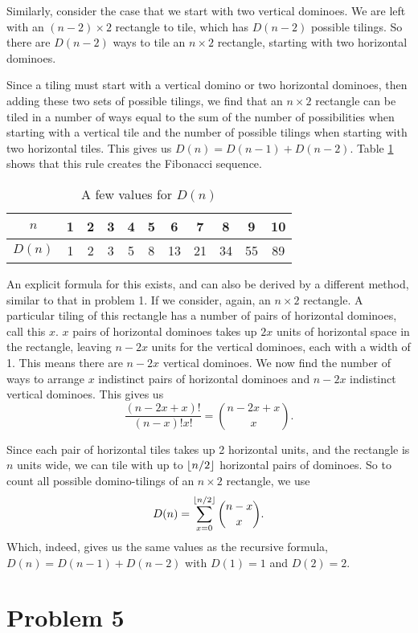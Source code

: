 \documentclass[12pt]{article}
\DeclarePairedDelimiter\floor{\lfloor}{\rfloor}
\begin{document}
Similarly, consider the case that we start with two vertical dominoes. We are left with an $(n-2)\times 2$ rectangle to tile, which has $D(n-2)$ possible tilings. So there are $D(n-2)$ ways to tile an $n\times 2$ rectangle, starting with two horizontal dominoes.

Since a tiling must start with a vertical domino or two horizontal dominoes, then adding these two sets of possible tilings, we find that an $n\times 2$ rectangle can be tiled in a number of ways equal to the sum of the number of possibilities when starting with a vertical tile and the number of possible tilings when starting with two horizontal tiles. This gives us $D(n) = D(n-1) + D(n-2)$. Table \ref{tab:dtab} shows that this rule creates the Fibonacci sequence. 

\begin{table}[ht]
    \centering
    \begin{tabular}{c|cccccccccc}
        $n$ & 1 & 2 & 3 & 4 & 5 & 6 & 7 & 8 & 9 & 10 \\
        \hline
        \cellcolor{white} $D(n)$ & 1 & 2 & 3 & 5 & 8 & 13 & 21 & 34 & 55 & 89
    \end{tabular}
    \caption{A few values for $D(n)$}
    \label{tab:dtab}
\end{table}

An explicit formula for this exists, and can also be derived by a different method, similar to that in problem 1. If we consider, again, an $n\times 2$ rectangle. A particular tiling of this rectangle has a number of pairs of horizontal dominoes, call this $x$. $x$ pairs of horizontal dominoes takes up $2x$ units of horizontal space in the rectangle, leaving $n-2x$ units for the vertical dominoes, each with a width of 1. This means there are $n-2x$ vertical dominoes. We now find the number of ways to arrange $x$ indistinct pairs of horizontal dominoes and $n-2x$ indistinct vertical dominoes. This gives us
\[\frac{(n-2x+x)!}{(n-x)!x!} = {n-2x+x \choose x}.\]

Since each pair of horizontal tiles takes up 2 horizontal units, and the rectangle is $n$ units wide, we can tile with up to $\floor{n/2}$ horizontal pairs of dominoes. So to count all possible domino-tilings of an $n\times 2$ rectangle, we use
\[D(n) = \sum_{x=0}^{\floor{n/2}} {n-x \choose x}.\]
Which, indeed, gives us the same values as the recursive formula, $D(n) = D(n-1) + D(n-2)$ with $D(1)=1$ and $D(2) = 2$.


\section*{Problem 5}
\\
\end{document}
